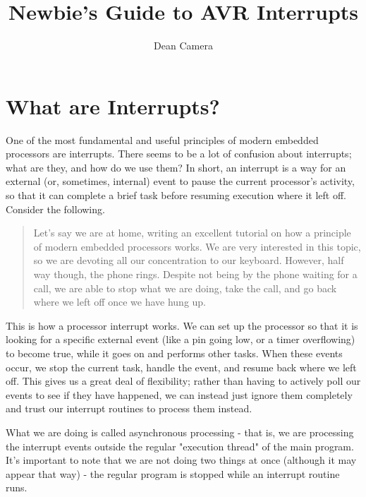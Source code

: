\documentclass[a4paper,oneside]{book}
\begin{document}
\title{Newbie's Guide to AVR Interrupts}
\author{Dean Camera}
\maketitle



\cleardoublepage
\tableofcontents
\cleardoublepage


\label{chp:WhatAreInts}
\chapter{What are Interrupts?}

One of the most fundamental and useful principles of modern embedded processors are interrupts. There seems to be a lot of confusion about interrupts; what are they, and how do we use them? In short, an interrupt is a way for an external (or, sometimes, internal) event to pause the current processor's activity, so that it can complete a brief task before resuming execution where it left off. Consider the following.

\begin{quote}
Let's say we are at home, writing an excellent tutorial on how a principle of modern embedded processors works. We are very interested in this topic, so we are devoting all our concentration to our keyboard. However, half way though, the phone rings. Despite not being by the phone waiting for a call, we are able to stop what we are doing, take the call, and go back where we left off once we have hung up.
\end{quote}

This is how a processor interrupt works. We can set up the processor so that it is looking for a specific external event (like a pin going low, or a timer overflowing) to become true, while it goes on and performs other tasks. When these events occur, we stop the current task, handle the event, and resume back where we left off. This gives us a great deal of flexibility; rather than having to actively poll our events to see if they have happened, we can instead just ignore them completely and trust our interrupt routines to process them instead.

What we are doing is called asynchronous processing - that is, we are processing the interrupt events outside the regular "execution thread" of the main program. It's important to note that we are not doing two things at once (although it may appear that way) - the regular program is stopped while an interrupt routine runs.
\end{document}
